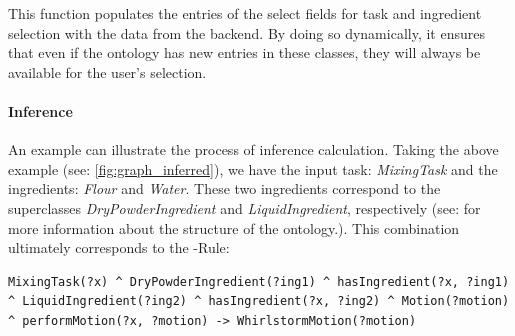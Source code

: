 This function populates the entries of the select fields for task and ingredient selection with the data from the backend. 
By doing so dynamically, it ensures that even if the ontology has new entries in these classes, they will always be available for the user's selection.

\paragraph{Inference}
\label{par:Inference}

An example can illustrate the process of inference calculation. Taking the above example (see: \ref{fig:graph_inferred}), we have the input task: \textit{MixingTask} and the ingredients: \textit{Flour} and \textit{Water}. 
These two ingredients correspond to the superclasses \textit{DryPowderIngredient} and \textit{LiquidIngredient}, respectively (see:  for more information 
about the structure of the ontology.). This combination ultimately corresponds to the -Rule:
\begin{lstlisting}
MixingTask(?x) ^ DryPowderIngredient(?ing1) ^ hasIngredient(?x, ?ing1)
^ LiquidIngredient(?ing2) ^ hasIngredient(?x, ?ing2) ^ Motion(?motion) 
^ performMotion(?x, ?motion) -> WhirlstormMotion(?motion)
\end{lstlisting}

